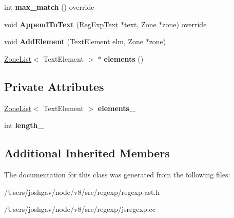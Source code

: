 \begin{DoxyCompactItemize}
\item 
int {\bfseries max\+\_\+match} () override\hypertarget{classv8_1_1internal_1_1_reg_exp_text_ac6e7ca99e8d7dc54bbd1b205953d2c52}{}\label{classv8_1_1internal_1_1_reg_exp_text_ac6e7ca99e8d7dc54bbd1b205953d2c52}

\item 
void {\bfseries Append\+To\+Text} (\hyperlink{classv8_1_1internal_1_1_reg_exp_text}{Reg\+Exp\+Text} $\ast$text, \hyperlink{classv8_1_1internal_1_1_zone}{Zone} $\ast$zone) override\hypertarget{classv8_1_1internal_1_1_reg_exp_text_a08e5bd7d0143a9b18a96cb99e0fac798}{}\label{classv8_1_1internal_1_1_reg_exp_text_a08e5bd7d0143a9b18a96cb99e0fac798}

\item 
void {\bfseries Add\+Element} (Text\+Element elm, \hyperlink{classv8_1_1internal_1_1_zone}{Zone} $\ast$zone)\hypertarget{classv8_1_1internal_1_1_reg_exp_text_a712a212b61a1885e17e905724731a233}{}\label{classv8_1_1internal_1_1_reg_exp_text_a712a212b61a1885e17e905724731a233}

\item 
\hyperlink{classv8_1_1internal_1_1_zone_list}{Zone\+List}$<$ Text\+Element $>$ $\ast$ {\bfseries elements} ()\hypertarget{classv8_1_1internal_1_1_reg_exp_text_a54dc3a5be0ef2e6447e154e594f3c779}{}\label{classv8_1_1internal_1_1_reg_exp_text_a54dc3a5be0ef2e6447e154e594f3c779}

\end{DoxyCompactItemize}
\subsection*{Private Attributes}
\begin{DoxyCompactItemize}
\item 
\hyperlink{classv8_1_1internal_1_1_zone_list}{Zone\+List}$<$ Text\+Element $>$ {\bfseries elements\+\_\+}\hypertarget{classv8_1_1internal_1_1_reg_exp_text_a53fa0e6b9c28cdf22bd4a95ab0fb17b8}{}\label{classv8_1_1internal_1_1_reg_exp_text_a53fa0e6b9c28cdf22bd4a95ab0fb17b8}

\item 
int {\bfseries length\+\_\+}\hypertarget{classv8_1_1internal_1_1_reg_exp_text_a1e4a9bad2aa9561772258cfb7dba7db1}{}\label{classv8_1_1internal_1_1_reg_exp_text_a1e4a9bad2aa9561772258cfb7dba7db1}

\end{DoxyCompactItemize}
\subsection*{Additional Inherited Members}


The documentation for this class was generated from the following files\+:\begin{DoxyCompactItemize}
\item 
/\+Users/joshgav/node/v8/src/regexp/regexp-\/ast.\+h\item 
/\+Users/joshgav/node/v8/src/regexp/jsregexp.\+cc\end{DoxyCompactItemize}
